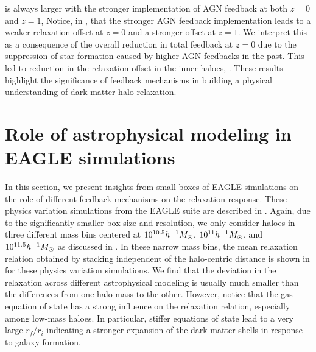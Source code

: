  is always larger with the stronger implementation of AGN feedback at both \( z=0 \) and \( z=1 \),   Notice, in , that the stronger AGN feedback implementation leads to a weaker relaxation offset at \( z=0 \) and a stronger offset at \( z=1 \).  We interpret this as a consequence of the overall reduction in total feedback at \( z=0 \) due to the suppression of star formation caused by higher AGN feedbacks in the past. This led to reduction in the relaxation offset in the inner haloes, . These results highlight the significance of feedback mechanisms in building a physical understanding of dark matter halo relaxation.










\section{Role of astrophysical modeling in EAGLE simulations}
\label{sec:res-physvar-eagle}

In this section, we present insights from small boxes of EAGLE simulations on the role of different feedback mechanisms on the relaxation response. These physics variation simulations from the EAGLE suite are described in . Again, due to the significantly smaller box size and resolution, we only consider haloes in three different mass bins centered at $10^{10.5} h^{-1}M_{\odot}$, $10^{11} h^{-1}M_{\odot}$, and $10^{11.5} h^{-1}M_{\odot}$ as discussed in . In these narrow mass bins, the mean relaxation relation obtained by stacking independent of the halo-centric distance is shown in  for these physics variation simulations. We find that the deviation in the relaxation across different astrophysical modeling is usually much smaller than the differences from one halo mass to the other. However, notice that the gas equation of state has a strong influence on the relaxation relation, especially among low-mass haloes. In particular, stiffer equations of state lead to a very large $r_f/r_i$ indicating a stronger expansion of the dark matter shells in response to galaxy formation.

